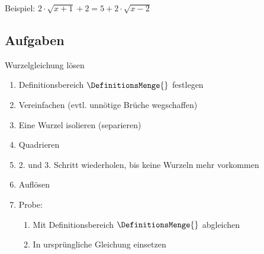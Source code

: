 \newpage


Beispiel: $2\cdot{}\sqrt{x+1} + 2 = 5 + 2\cdot{}\sqrt{x-2}$


\subsection*{Aufgaben}


\begin{rezept}{Wurzelgleichung lösen}{}
  \begin{enumerate}
  \item Definitionsbereich $\DefinitionsMenge{}$ festlegen
  \item Vereinfachen (evtl. unnötige Brüche wegschaffen)
  \item Eine Wurzel isolieren (separieren)
  \item Quadrieren
  \item 2. und 3. Schritt wiederholen, bis keine Wurzeln mehr
    vorkommen
  \item Auflösen
  \item Probe:
    \begin{enumerate}
    \item Mit Definitionsbereich $\DefinitionsMenge{}$ abgleichen
    \item In ursprüngliche Gleichung einsetzen
    \end{enumerate}
  \end{enumerate}
\end{rezept}



\newpage
